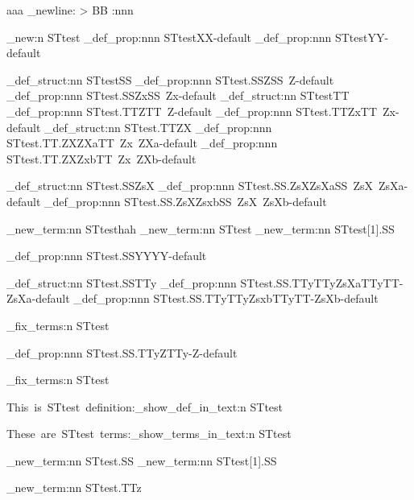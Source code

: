 \documentclass{article}
\begin{document}
\ExplSyntaxOn

aaa \iow_newline: > BB \use:nnn { ~ } { ~ } { ~ }
\par
\starray_new:n {STtest}
\starray_def_prop:nnn {STtest}{X}{X-default}
\starray_def_prop:nnn {STtest}{Y}{Y-default}

\starray_def_struct:nn {STtest}{SS}
\starray_def_prop:nnn {STtest.SS}{Z}{SS~Z-default}
\starray_def_prop:nnn {STtest.SS}{Zx}{SS~Zx-default}
\starray_def_struct:nn {STtest}{TT}
\starray_def_prop:nnn {STtest.TT}{Z}{TT~Z-default}
\starray_def_prop:nnn {STtest.TT}{Zx}{TT~Zx-default}
\starray_def_struct:nn {STtest.TT}{ZX}
\starray_def_prop:nnn {STtest.TT.ZX}{ZXa}{TT~Zx~ZXa-default}
\starray_def_prop:nnn {STtest.TT.ZX}{Zxb}{TT~Zx~ZXb-default}

\starray_def_struct:nn {STtest.SS}{ZsX}
\starray_def_prop:nnn {STtest.SS.ZsX}{ZsXa}{SS~ZsX~ZsXa-default}
\starray_def_prop:nnn {STtest.SS.ZsX}{Zsxb}{SS~ZsX~ZsXb-default}



\starray_new_term:nn {STtest}{hah}
\starray_new_term:nn {STtest}{}
\starray_new_term:nn {STtest[1].SS}{}

\starray_def_prop:nnn {STtest.SS}{YY}{YY-default}




\starray_def_struct:nn {STtest.SS}{TTy}
\starray_def_prop:nnn {STtest.SS.TTy}{TTyZsXa}{TTyTT-ZsXa-default}
\starray_def_prop:nnn {STtest.SS.TTy}{TTyZsxb}{TTyTT-ZsXb-default}

\starray_fix_terms:n {STtest}


\starray_def_prop:nnn {STtest.SS.TTy}{Z}{TTy-Z-default}


\starray_fix_terms:n {STtest}

This~is~STtest~definition:\starray_show_def_in_text:n {STtest}


\par These~are~STtest~terms:\starray_show_terms_in_text:n {STtest}


        \starray_new_term:nn {STtest.SS}{}
        \starray_new_term:nn {STtest[1].SS}{}

        \starray_new_term:nn {STtest.TTz}{}
\end{document}
